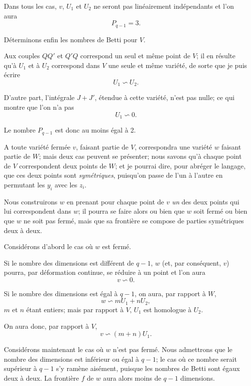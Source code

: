 \documentclass{article}
\begin{document}
Dans tous les cas, $v$, $U_{1}$ et $U_{2}$ ne seront pas linéairement indépendants et l'on aura
\[ P_{q-1} = 3. \]

Déterminons enfin les nombres de Betti pour $V$.

Aux couples $QQ'$ et $Q'Q$ correspond un seul et même point de $V$; il
en résulte qu'à $U_{1}$ et à $U_{2}$ correspond dans $V$ une seule et même variété, de sorte que je puis écrire
\[ U_{1} \backsim U_{2}. \]

D'autre part, l'intégrale $J + J'$, étendue à cette variété, n'est pas nulle; ce qui montre que l'on n'a pas
\[ U_{1} \backsim 0. \]

Le nombre $P_{q-1}$ est donc au moins égal à 2.

A toute variété fermée $v$, faisant partie de $V$, correspondra une variété $w$ faisant partie de $W$; mais deux cas peuvent se présenter; nous savons qu'à chaque point de $V$ correspondent deux points de $W$; et je pourrai dire, pour abréger le langage, que ces deux points sont \emph{symétriques}, puisqu'on passe de l'un à l'autre en permutant les $y_{i}$ avec les $z_{i}$.

Nous construirons $w$ en prenant pour chaque point de $v$ \emph{un} des deux points qui lui correspondent dans $w$; il pourra se faire alors ou bien que $w$ soit fermé ou bien que $w$ ne soit pas fermé, mais que sa frontière se compose de parties symétriques deux à deux.

Considérons d'abord le cas où $w$ est fermé.

Si le nombre des dimensions est différent de $q - 1$, $w$ (et, par conséquent, $v$) pourra, par déformation continue, se réduire à un point et l'on aura
\[ v \backsim 0. \]

Si le nombre des dimensions est égal à $q - 1$, on aura, par rapport à $W$,
\[ w \backsim mU_{1} + nU_{2}, \]
$m$ et $n$ étant entiers; mais par rapport à $V$, $U_{1}$ est homologue à $U_{2}$.

On aura donc, par rapport à $V$,
\[ v \backsim (m + n)U_{1}. \]

Considérons maintenant le cas où $w$ n'est pas fermé. Nous admettrons
que le nombre des dimensions est inférieur ou égal à $q - 1$; le cas où ce nombre serait supérieur à $q - 1$ s'y ramène aisément, puisque les nombres de Betti sont égaux deux à deux. La frontière $f$ de $w$ aura alors moins de $q - 1$ dimensions.
\end{document}

